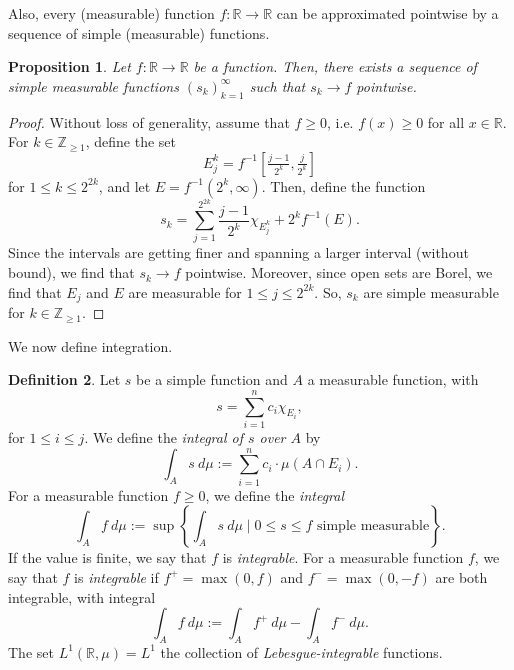 \documentclass[a4paper, openany]{memoir}
\theoremstyle{definition}
\newtheorem{definition}{Definition}[section]
\theoremstyle{plain}
\newtheorem{proposition}[definition]{Proposition}
\begin{document}
    Also, every (measurable) function $f \colon \mathbb{R} \to \mathbb{R}$ can be approximated pointwise by a sequence of simple (measurable) functions.
    \begin{proposition}
        Let $f \colon \mathbb{R} \to \mathbb{R}$ be a function. Then, there exists a sequence of simple measurable functions $(s_k)_{k=1}^\infty$ such that $s_k \to f$ pointwise.
    \end{proposition}
    \begin{proof}
        Without loss of generality, assume that $f \geq 0$, i.e. $f(x) \geq 0$ for all $x \in \mathbb{R}$. For $k \in \mathbb{Z}_{\geq 1}$, define the set
        \[E_j^k = f^{-1} [\tfrac{j-1}{2^k}, \tfrac{j}{2^k}]\]
        for $1 \leq k \leq 2^{2k}$, and let $E = f^{-1}(2^k, \infty)$. Then, define the function
        \[s_k = \sum_{j=1}^{2^{2k}} \frac{j-1}{2^k} \chi_{E_j^k} + 2^k f^{-1} (E).\]
        Since the intervals are getting finer and spanning a larger interval (without bound), we find that $s_k \to f$ pointwise. Moreover, since open sets are Borel, we find that $E_j$ and $E$ are measurable for $1 \leq j \leq 2^{2k}$. So, $s_k$ are simple measurable for $k \in \mathbb{Z}_{\geq 1}$.
    \end{proof}

    We now define integration.
    \begin{definition}
        Let $s$ be a simple function and $A$ a measurable function, with
        \[s = \sum_{i=1}^n c_i \chi_{E_i},\]
        for $1 \leq i \leq j$. We define the \emph{integral of $s$ over $A$} by
        \[\int_A s \ d\mu := \sum_{i=1}^n c_i \cdot \mu(A \cap E_i).\]
        For a measurable function $f \geq 0$, we define the \emph{integral}
        \[\int_A f \ d\mu := \sup \left\{\int_A s \ d\mu \mid 0 \leq s \leq f \textrm{ simple measurable}\right\}.\]
        If the value is finite, we say that $f$ is \emph{integrable}. For a measurable function $f$, we say that $f$ is \emph{integrable} if $f^+ = \max(0, f)$ and $f^- = \max(0, -f)$ are both integrable, with integral
        \[\int_A f \ d\mu := \int_A f^+ \ d\mu - \int_A f^- \ d\mu.\]
        The set $L^1(\mathbb{R}, \mu) = L^1$ the collection of \emph{Lebesgue-integrable} functions.
    \end{definition}
\end{document}
